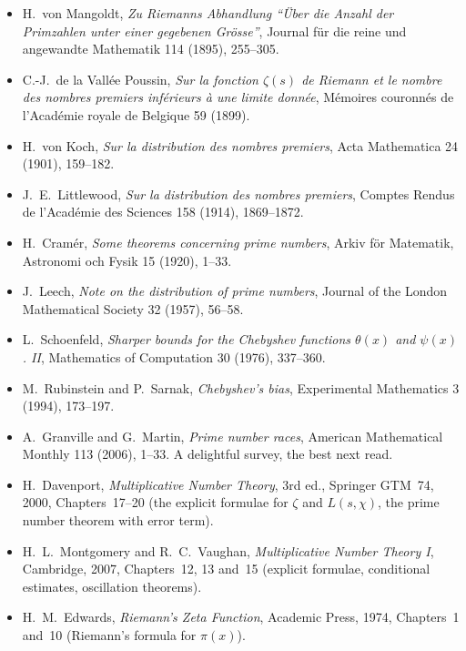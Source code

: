 \begin{itemize}
\item H.~von Mangoldt, \emph{Zu Riemanns Abhandlung ``Über die Anzahl der Primzahlen unter einer gegebenen Grösse''}, Journal für die reine und angewandte Mathematik 114 (1895), 255--305.
\item C.-J.~de la Vallée Poussin, \emph{Sur la fonction $\zeta(s)$ de Riemann et le nombre des nombres premiers inférieurs à une limite donnée}, Mémoires couronnés de l'Académie royale de Belgique 59 (1899).
\item H.~von Koch, \emph{Sur la distribution des nombres premiers}, Acta Mathematica 24 (1901), 159--182.
\item J.~E.~Littlewood, \emph{Sur la distribution des nombres premiers}, Comptes Rendus de l'Académie des Sciences 158 (1914), 1869--1872.
\item H.~Cramér, \emph{Some theorems concerning prime numbers}, Arkiv för Matematik, Astronomi och Fysik 15 (1920), 1--33.
\item J.~Leech, \emph{Note on the distribution of prime numbers}, Journal of the London Mathematical Society 32 (1957), 56--58.
\item L.~Schoenfeld, \emph{Sharper bounds for the Chebyshev functions $\theta(x)$ and $\psi(x)$. II}, Mathematics of Computation 30 (1976), 337--360.
\item M.~Rubinstein and P.~Sarnak, \emph{Chebyshev's bias}, Experimental Mathematics 3 (1994), 173--197.
\item A.~Granville and G.~Martin, \emph{Prime number races}, American Mathematical Monthly 113 (2006), 1--33. A delightful survey, the best next read.
\item H.~Davenport, \emph{Multiplicative Number Theory}, 3rd ed., Springer GTM~74, 2000, Chapters~17--20 (the explicit formulae for $\zeta$ and $L(s,\chi)$, the prime number theorem with error term).
\item H.~L.~Montgomery and R.~C.~Vaughan, \emph{Multiplicative Number Theory I}, Cambridge, 2007, Chapters~12, 13 and~15 (explicit formulae, conditional estimates, oscillation theorems).
\item H.~M.~Edwards, \emph{Riemann's Zeta Function}, Academic Press, 1974, Chapters~1 and~10 (Riemann's formula for $\pi(x)$).
\end{itemize}
